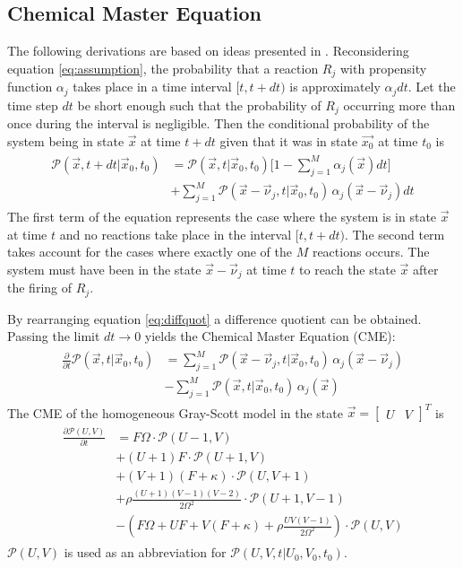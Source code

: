 \subsection{Chemical Master Equation}
The following derivations are based on ideas presented in \cite{lipkova_stochastic_2011}. Reconsidering equation \eqref{eq:assumption}, the probability that a reaction $R_j$ with propensity function $\alpha_j$ takes place in a time interval $\lbrack t, t+dt)$ is approximately $\alpha_j dt$. Let the time step $dt$ be short enough such that the probability of $R_j$ occurring more than once during the interval is negligible. Then the conditional probability of the system being in state $\vec{x}$ at time $t+dt$ given that it was in state $\vec{x_0}$ at time $t_0$ is
\begin{align}
\begin{split}
\label{eq:diffquot}
\mathcal{P}(\vec{x},t+dt|\vec{x}_0,t_0) &= \mathcal{P}(\vec{x},t|\vec{x}_0,t_0) \lbrack 1 - \sum_{j=1}^M \alpha_j(\vec{x}) dt \rbrack \\
&+ \sum_{j=1}^M \mathcal{P}(\vec{x} - \vec{\nu}_j,t|\vec{x}_0,t_0) \,\alpha_j(\vec{x} - \vec{\nu}_j) dt
\end{split}
\end{align}
The first term of the equation represents the case where the system is in state $\vec{x}$ at time $t$ and no reactions take place in the interval $\lbrack t,t+dt)$. The second term takes account for the cases where exactly one of the $M$ reactions occurs. The system must have been in the state $\vec{x} - \vec{\nu}_j$ at time $t$ to reach the state $\vec{x}$ after the firing of $R_j$. 

By rearranging equation \eqref{eq:diffquot} a difference quotient can be obtained. Passing the limit $dt \rightarrow 0$ yields the Chemical Master Equation (CME):
\begin{align}
\begin{split}
\frac{\partial}{\partial t} \mathcal{P}(\vec{x},t|\vec{x}_0,t_0) &= \sum_{j=1}^M \mathcal{P}(\vec{x}-\vec{\nu}_j,t|\vec{x}_0,t_0) \,\alpha_j(\vec{x} - \vec{\nu}_j) \\
&- \sum_{j=1}^M \mathcal{P}(\vec{x},t|\vec{x}_0,t_0) \,\alpha_j(\vec{x})
\end{split}
\end{align}
The CME of the homogeneous Gray-Scott model in the state $\vec{x} = \begin{bmatrix} U & V\end{bmatrix}^T$ is
\begin{align}
\begin{split}
\frac{\partial \mathcal{P}(U,V)}{\partial t} &= F \Omega \cdot \mathcal{P}(U-1,V) \\
&+ (U+1)F \cdot \mathcal{P}(U+1,V) \\
&+ (V+1) (F+\kappa) \cdot \mathcal{P}(U,V+1) \\
&+ \rho \frac{(U+1) (V-1) (V-2)}{2\Omega^2} \cdot \mathcal{P}(U+1,V-1) \\
&- \left(F\Omega + UF + V(F+\kappa) + \rho \frac{UV(V-1)}{2\Omega^2}\right) \cdot \mathcal{P}(U,V)
\end{split}
\end{align}
$\mathcal{P}(U,V)$ is used as an abbreviation for $\mathcal{P}(U,V,t|U_0,V_0,t_0)$. 

